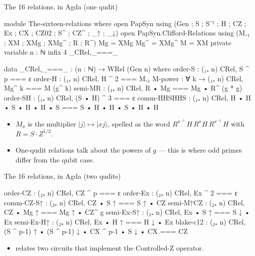 \documentclass[aspectratio=169]{beamer}
\newcommand{\ket}[1]{|#1\rangle}
\begin{document}
\begin{frame}{The 16 relations, in Agda (one qudit)}
\begin{code}[hide]
module The-sixteen-relations where
  open PapSyn using (Gen ; S ; S⁻¹ ; H ; CZ ; Ex ; CX ; CZ02 ; S^ ; CZ^ ; _↑ ; _↓)
  open PapSyn.Clifford-Relations using (M₋₁ ; XM ; XMg ; XMg^ ; R ; R^)
  Mg = XMg
  Mg^ = XMg^
  M = XM
  private variable n : ℕ
  infix 4 _CRel,_===_
\end{code}
\begin{code}
  data _CRel,_===_ : (n : ℕ) → WRel (Gen n) where
    order-S      :        (₁₊ n) CRel,  S ^ p === ε
    order-H      :        (₁₊ n) CRel,  H ^ 2 === M₋₁
    M-power      : ∀ k →  (₁₊ n) CRel,  Mg^ k === M (g^ k)
    semi-MR      :        (₁₊ n) CRel,  R • Mg === Mg • R^ (g * g)
    order-SH     :        (₁₊ n) CRel,  (S • H) ^ 3 === ε
    comm-HHSHHS  :        (₁₊ n) CRel,  H • H • S • H • H • S === S • H • H • S • H • H
\end{code}
  \vfill
  \begin{itemize}
    \item $M_x$ is the multiplier $\ket{j} \mapsto \ket{xj}$, spelled as the
          word $R^{x^{-1}}\, H\, R^x H\, R^{x^{-1}}\, H$ with $R = S \cdot Z^{1/2}$.
    \item One-qudit relations talk about the powers of $g$ --- this is
      where odd primes differ from the qubit case.
  \end{itemize}
\end{frame}

\begin{frame}{The 16 relations, in Agda (two qudits)}
\begin{code}
    order-CZ     :        (₂₊ n) CRel,  CZ ^ p === ε
    order-Ex     :        (₂₊ n) CRel,  Ex ^ 2 === ε
    comm-CZ-S↑   :        (₂₊ n) CRel,  CZ • S ↑ === S ↑ • CZ
    semi-M↑CZ    :        (₂₊ n) CRel,  CZ • Mg ↑ === Mg ↑ • CZ^ g
    semi-Ex-S↑   :        (₂₊ n) CRel,  Ex • S ↑ === S ↓ • Ex
    semi-Ex-H↑   :        (₂₊ n) CRel,  Ex • H ↑ === H ↓ • Ex
    blake-c12    :        (₂₊ n) CRel,  (S ^ p-1) ↑ • (S ^ p-1) ↓ • CX ^ p-1 • S ↓ • CX === CZ
\end{code}
  \vfill
  \begin{itemize}
    \item {} relates two circuits
      that implement the Controlled-Z operator.
  \end{itemize}
\end{frame}
\end{document}

